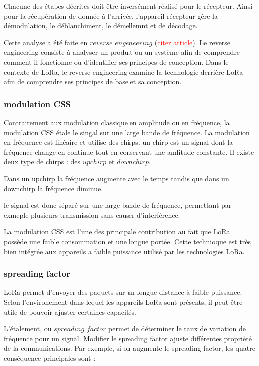 \documentclass[12pt,a4paper,oneside, titlepage]{report}
\begin{document}
Chacune des étapes décrites doit être inversément réalisé pour le récepteur. Ainsi pour la récupération de donnée à l'arrivée, l'appareil récepteur gère la démodulation, le déblanchiment, le démellemnt et de décodage.


Cette analyse a été faite en $reverse$ $engeneering$ (\textcolor{red}{citer article}). Le reverse engineering consiste à analyser un produit ou un système afin de comprendre comment il fonctionne ou d'identifier ses principes de conception. Dans le contexte de LoRa, le reverse engineering examine la technologie derrière LoRa afin de comprendre ses principes de base et sa conception.


\subsubsection{modulation CSS}

Contrairement aux modulation classique en amplitude ou en fréquence, la modulation CSS étale le singal sur une large bande de fréquence. La modulation en fréquence est linéaire et utilise des chirps. un chirp est un signal dont la fréquence change en continue tout en conservant une amlitude constante. Il existe deux type de chirps : des $upchirp$ et $downchirp$.

Dans un upchirp la fréquence augmente avec le temps tandis que dans un downchirp la fréquence diminue.

le signal est donc séparé sur une large bande de fréquence, permettant par exmeple plusieurs transmission sans causer d'interférence.

La modulation CSS est l'une des principale contribution au fait que LoRa possède une faible consommation et une longue portée. Cette technioque est très bien intégrée aux appareils a faible puissance utilisé par les technologies LoRa.

\subsubsection{spreading factor}

LoRa permet d'envoyer des paquets sur un longue distance à faible puissance. Selon l'environement dans lequel les appareils LoRa sont présents, il peut être utile de pouvoir ajuster certaines capacités.

L'étalement, ou $spreading$ $factor$ permet de déterminer le taux de variation de fréquence pour un signal. Modifier le spreading factor ajuste différentes propriété de la communications. Par exemple, si on augmente le spreading factor, les quatre conséquence principales sont :
\end{document}
